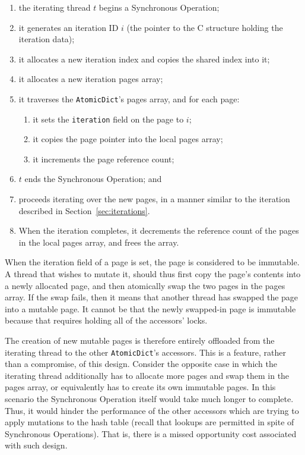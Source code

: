 \begin{enumerate}
    \item the iterating thread $t$ begins a Synchronous Operation;
    \item it generates an iteration ID $i$ (the pointer to the C structure holding the iteration data);
    \item it allocates a new iteration index and copies the shared index into it;
    \item it allocates a new iteration pages array;
    \item it traverses the \texttt{AtomicDict}'s pages array, and for each page:
    \begin{enumerate}
        \item it sets the \texttt{iteration} field on the page to $i$;
        \item it copies the page pointer into the local pages array;
        \item it increments the page reference count;
    \end{enumerate}
    \item $t$ ends the Synchronous Operation; and
    \item proceeds iterating over the new pages, in a manner similar to the iteration described in Section~\ref{sec:iterations}.
    \item When the iteration completes, it decrements the reference count of the pages in the local pages array, and frees the array.
\end{enumerate}

When the iteration field of a page is set, the page is considered to be immutable.
A thread that wishes to mutate it, should thus first copy the page's contents into a newly allocated page, and then atomically swap the two pages in the pages array.
If the swap fails, then it means that another thread has swapped the page into a mutable page.
It cannot be that the newly swapped-in page is immutable because that requires holding all of the accessors' locks.

The creation of new mutable pages is therefore entirely offloaded from the iterating thread to the other \texttt{AtomicDict}'s accessors.
This is a feature, rather than a compromise, of this design.
Consider the opposite case in which the iterating thread additionally has to allocate more pages and swap them in the pages array, or equivalently has to create its own immutable pages.
In this scenario the Synchronous Operation itself would take much longer to complete.
Thus, it would hinder the performance of the other accessors which are trying to apply mutations to the hash table (recall that lookups are permitted in spite of Synchronous Operations).
That is, there is a missed opportunity cost associated with such design.

